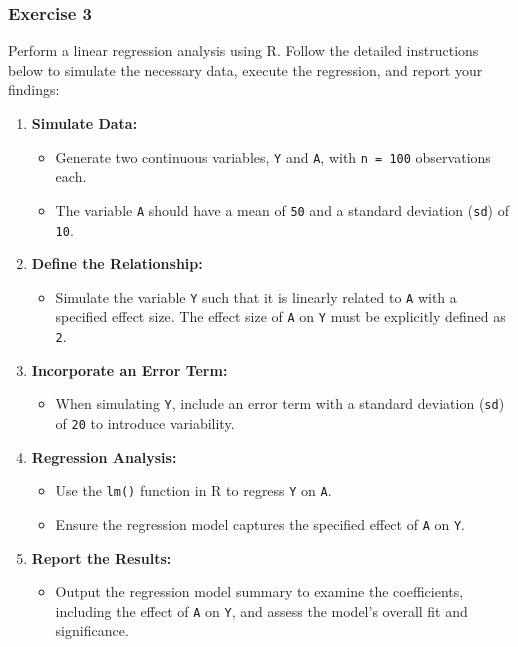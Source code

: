 \documentclass[
  singlecolumn]{article}
\providecommand{\tightlist}{%
  \setlength{\itemsep}{0pt}\setlength{\parskip}{0pt}}\usepackage{longtable,booktabs,array}
\theoremstyle{definition}
\theoremstyle{remark}
\begin{document}
\subsubsection{Exercise 3}\label{exercise-3}

Perform a linear regression analysis using R. Follow the detailed
instructions below to simulate the necessary data, execute the
regression, and report your findings:

\begin{enumerate}
\def\labelenumi{\arabic{enumi}.}
\tightlist
\item
  \textbf{Simulate Data:}

  \begin{itemize}
  \tightlist
  \item
    Generate two continuous variables, \texttt{Y} and \texttt{A}, with
    \texttt{n\ =\ 100} observations each.
  \item
    The variable \texttt{A} should have a mean of \texttt{50} and a
    standard deviation (\texttt{sd}) of \texttt{10}.
  \end{itemize}
\item
  \textbf{Define the Relationship:}

  \begin{itemize}
  \tightlist
  \item
    Simulate the variable \texttt{Y} such that it is linearly related to
    \texttt{A} with a specified effect size. The effect size of
    \texttt{A} on \texttt{Y} must be explicitly defined as \texttt{2}.
  \end{itemize}
\item
  \textbf{Incorporate an Error Term:}

  \begin{itemize}
  \tightlist
  \item
    When simulating \texttt{Y}, include an error term with a standard
    deviation (\texttt{sd}) of \texttt{20} to introduce variability.
  \end{itemize}
\item
  \textbf{Regression Analysis:}

  \begin{itemize}
  \tightlist
  \item
    Use the \texttt{lm()} function in R to regress \texttt{Y} on
    \texttt{A}.
  \item
    Ensure the regression model captures the specified effect of
    \texttt{A} on \texttt{Y}.
  \end{itemize}
\item
  \textbf{Report the Results:}

  \begin{itemize}
  \tightlist
  \item
    Output the regression model summary to examine the coefficients,
    including the effect of \texttt{A} on \texttt{Y}, and assess the
    model's overall fit and significance.
  \end{itemize}
\end{enumerate}
\end{document}
